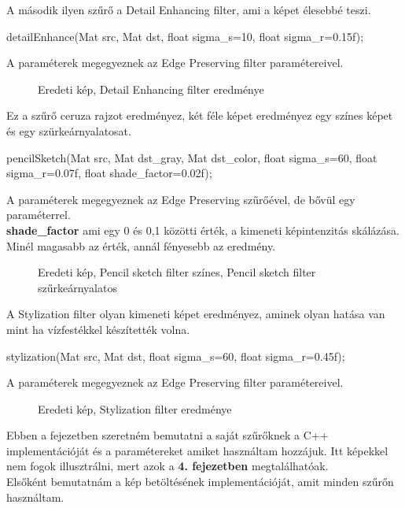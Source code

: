 A második ilyen szűrő a Detail Enhancing filter, ami a képet élesebbé teszi.
\begin{cpp}
detailEnhance(Mat src, Mat dst, float sigma_s=10, float sigma_r=0.15f);
\end{cpp}
A paraméterek megegyeznek az Edge Preserving filter paramétereivel. 
 \begin{figure}[ht]
\centering
{}
\caption{Eredeti kép, Detail Enhancing filter eredménye} 
\label{fig:detailEnhance}
\end{figure}
Ez a szűrő ceruza rajzot eredményez, két féle képet eredményez egy színes képet és egy szürkeárnyalatosat.
\begin{cpp}
pencilSketch(Mat src, Mat dst_gray, Mat dst_color, float sigma_s=60, 
		float sigma_r=0.07f, float shade_factor=0.02f);
\end{cpp}
A paraméterek megegyeznek az Edge Preserving szűrőével, de bővül egy paraméterrel.\\
\indent \textbf{shade\_factor}  ami egy 0 és 0,1 közötti érték, a kimeneti képintenzitás skálázása. Minél magasabb az érték, annál fényesebb az eredmény.
\begin{figure}[ht]
\centering
{}
\caption{Eredeti kép, Pencil sketch filter színes, Pencil sketch filter szűrkeárnyalatos} 
\label{fig: pencil_sketch_color_grey}
\end{figure}
A Stylization filter olyan kimeneti képet eredményez, aminek olyan hatása van mint ha vízfestékkel készítették volna.
\begin{cpp}
stylization(Mat src, Mat dst, float sigma_s=60, float sigma_r=0.45f);
\end{cpp}
A paraméterek megegyeznek az Edge Preserving filter paramétereivel. 
 \begin{figure}[ht]
\centering
{}
\caption{Eredeti kép, Stylization filter eredménye} 
\label{fig: stylization}
\end{figure}
Ebben a fejezetben szeretném bemutatni a saját szűrőknek a C++ implementációját és a paramétereket amiket használtam hozzájuk. Itt képekkel nem fogok illusztrálni, mert azok a \textbf{4. fejezetben} megtalálhatóak. \\ Elsőként bemutatnám a kép betöltésének implementációját, amit minden szűrőn használtam.
